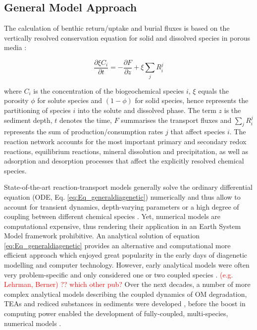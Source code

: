 \documentclass[gmd, manuscript]{copernicus}
\begin{document}
\subsection {General Model Approach} \label{subsec:GeneralModelApproach}
The calculation of benthic return/uptake and burial fluxes is based on the vertically resolved conservation equation for solid and dissolved species in porous media 
\citep[e.g.][]{berner_early_1980, boudreau1997diagenetic}:

\begin{equation} 
\frac{\partial \xi C_i}{\partial t}=-\frac{\partial F}{\partial z}+\xi \sum_j R_i^j \label{eq:Eq_generaldiagenetic}
\end{equation}

where $C_i$ is the concentration of the biogeochemical species $i$, $\xi$ equals the porosity $\phi$ for solute species and $(1-\phi)$ for solid species, hence represents the partitioning of species $i$ 
into the solute and dissolved phase. The term $z$ is the sediment depth, $t$ denotes the time, $F$ summarises the transport fluxes and $\sum_j R_i^j$ represents the sum of production/consumption rates $j$ 
that affect species $i$. The reaction network accounts for the most important primary and secondary redox reactions, equilibrium reactions, mineral dissolution and precipitation, as well as adsorption 
and desorption processes that affect the explicitly resolved chemical species. 

State-of-the-art reaction-transport models generally solve the ordinary differential equation (ODE, Eq. \ref{eq:Eq_generaldiagenetic}) numerically and thus allow to account for transient dynamics, 
depth-varying parameters or a high degree of coupling between different chemical species \citep[e.g.][]{soetaert_model_1996, aguilera_knowledge-based_2005}. 
Yet, numerical models are computational expensive, thus rendering their application in an Earth System Model framework prohibitive. An analytical solution of equation \eqref{eq:Eq_generaldiagenetic} 
provides an alternative and computational more efficient approach which enjoyed great popularity in the early days of diagenetic modelling and computer technology. %
However, early analytical models were often very problem-specific and only considered one or two coupled species \citep[e.g.][]{berner_idealized_1964}. \textcolor{red}{(e.g. Lehrman, Berner) ?? which other pub?}
Over the next decades, a number of more complex analytical models describing the coupled dynamics of OM degradation, TEAs and rediced substances in sediments were developed \citep[e.g.][]{billen1982modelling, goloway1982diagenetic, jahnke1982model}, 
before the boost in computing power enabled the development of fully-coupled, multi-species, numerical models \citep[e.g.][]{van1995metal, soetaert_model_1996}. 
\end{document}

